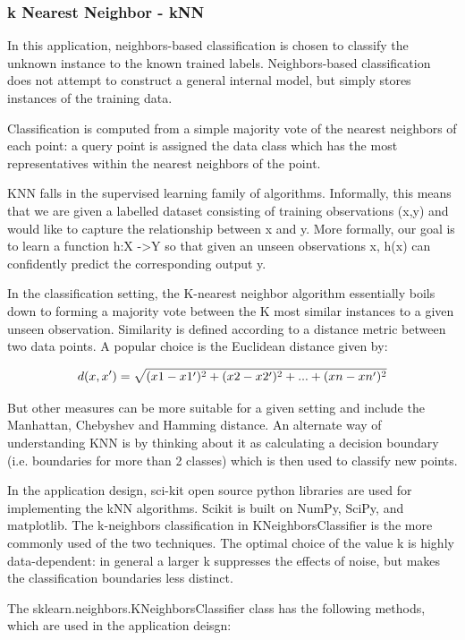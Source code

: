 \documentclass[sigconf]{acmart}
\begin{document}
\subsubsection{k Nearest Neighbor - kNN}
\cite{Kevin2016} In this application, neighbors-based classification is chosen to classify the unknown instance to the known trained labels. Neighbors-based classification does not attempt to construct a general internal model, but simply stores instances of the training data.


Classification is computed from a simple majority vote of the nearest neighbors of each point: a query point is assigned the data class which has the most representatives within the nearest neighbors of the point.


KNN falls in the supervised learning family of algorithms. Informally, this means that we are given a labelled dataset consisting of training observations (x,y) and would like to capture the relationship between x and y. More formally, our goal is to learn a function h:X ->Y so that given an unseen observations x, h(x) can confidently predict the corresponding output y.


In the classification setting, the K-nearest neighbor algorithm essentially boils down to forming a majority vote between the K most similar instances to a given unseen observation. Similarity is defined according to a distance metric between two data points. A popular choice is the Euclidean distance given by:


\[
d(x,x')=\sqrt{(x1-x1\rq)^2+(x2-x2\rq)^2+...+(xn-xn\rq)^2}
\]


But other measures can be more suitable for a given setting and include the Manhattan, Chebyshev and Hamming distance. 
An alternate way of understanding KNN is by thinking about it as calculating a decision boundary (i.e. boundaries for more than 2 classes) which is then used to classify new points.

In the application design, sci-kit open source python libraries are used for implementing the kNN algorithms. Scikit is built on NumPy, SciPy, and matplotlib. The k-neighbors classification in KNeighborsClassifier is the more commonly used of the two techniques. The optimal choice of the value k is highly data-dependent: in general a larger k suppresses the effects of noise, but makes the classification boundaries less distinct.

The sklearn.neighbors.KNeighborsClassifier class has the following methods, which are used in the application deisgn:
\end{document}
